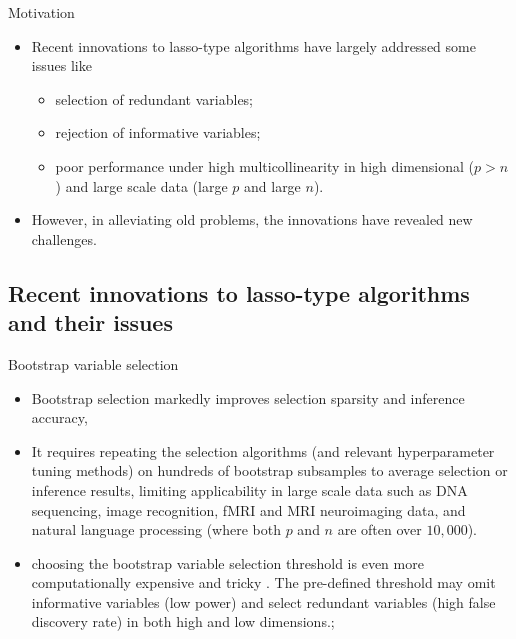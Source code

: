 \documentclass{beamer}
\begin{document}
\begin{frame}{Motivation}

  \begin{itemize}    
    \item Recent innovations to lasso-type algorithms have largely addressed some issues like
    \begin{itemize}
      \item selection of redundant variables;
      \item rejection of informative variables; 
      \item poor performance under high multicollinearity in high dimensional ($p>n$) and large scale data (large $p$ and large $n$). 
    \end{itemize} 
    \item However, in alleviating old problems, the innovations have revealed new challenges.
  \end{itemize}

\end{frame}


\subsection{Recent innovations to lasso-type algorithms and their issues}


\begin{frame}{Bootstrap variable selection}
  \begin{itemize}
      \item Bootstrap selection \citep{bach2008bolasso,meinshausen2010stability,wang2011random,mameli2017estimating} markedly improves selection sparsity and inference accuracy,
      \item It requires repeating the selection algorithms (and relevant hyperparameter tuning methods) on hundreds of bootstrap subsamples to average selection or inference results, limiting applicability in large scale data such as DNA sequencing, image recognition, fMRI and MRI neuroimaging data, and natural language processing (where both $p$ and $n$ are often over $10,000$). 
      \item choosing the bootstrap variable selection threshold is even more computationally expensive and tricky \citep{bach2008bolasso, huang2014stat}. The pre-defined threshold may omit informative variables (low power) and select redundant variables (high false discovery rate) in both high and low dimensions.;
  \end{itemize}
\end{frame}
\end{document}
